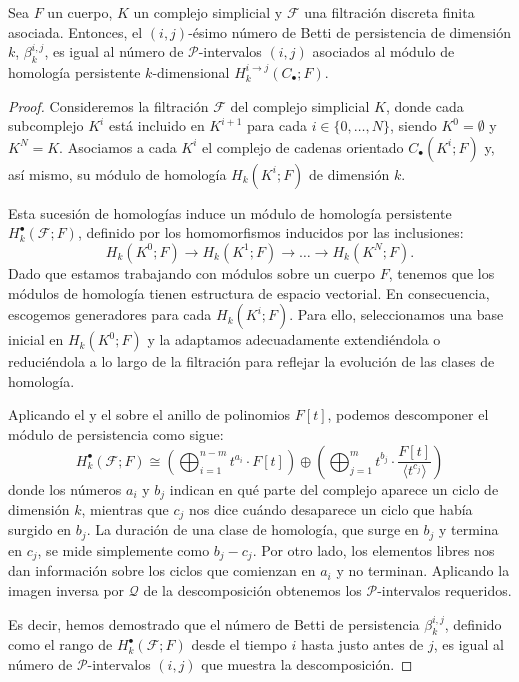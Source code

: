 \begin{corolario}
	Sea $F$ un cuerpo, $K$ un complejo simplicial y $\mathcal{F}$ una filtración discreta finita asociada. Entonces, el $(i,j)$-ésimo número de Betti de persistencia de dimensión $k$, \(\beta_k^{i,j}\), es igual al número de $\mathcal{P}$-intervalos $(i,j)$ asociados al módulo de homología persistente $k$-dimensional  \(H_k^{i \to j}(C_\bullet;F)\).
\end{corolario}
\begin{proof}
	Consideremos la filtración $\mathcal{F}$ del complejo simplicial $K$, donde cada subcomplejo $K^i$ está incluido en $K^{i+1}$ para cada $i \in \{0, \ldots, N\}$, siendo $K^0=\emptyset$ y $K^N = K$. Asociamos a cada $K^i$ el complejo de cadenas orientado $C_\bullet(K^i; F)$ y, así mismo, su módulo de homología $H_k(K^i; F)$ de dimensión $k$.
	
	Esta sucesión de homologías induce un módulo de homología persistente $H_k^\bullet(\mathcal{F}; F)$, definido por los homomorfismos inducidos por las inclusiones:
	\[
	H_k(K^0; F) \to H_k(K^1; F) \to \dots \to H_k(K^N; F).
	\]
	Dado que estamos trabajando con módulos sobre un cuerpo $F$, tenemos que los módulos de homología tienen estructura de espacio vectorial. En consecuencia, escogemos generadores para cada $H_k(K^i; F)$. Para ello, seleccionamos una base inicial en $H_k(K^0; F)$ y la adaptamos adecuadamente extendiéndola o reduciéndola a lo largo de la filtración para reflejar la evolución de las clases de homología.
	
	Aplicando el  y el  sobre el anillo de polinomios $F[t]$, podemos descomponer el módulo de persistencia como sigue:
	\[
	H_k^\bullet(\mathcal{F}; F) \cong \left( \bigoplus_{i=1}^{n-m} t^{a_i} \cdot F[t] \right) \oplus \left( \bigoplus_{j=1}^m t^{b_j} \cdot \frac{F[t]}{ \langle t^{c_j} \rangle} \right)
	\]
	donde los números \(a_i\) y \(b_j\) indican en qué parte del complejo aparece un ciclo de dimensión \(k\), mientras que \(c_j\) nos dice cuándo desaparece un ciclo que había surgido en \(b_j\). La duración de una clase de homología, que surge en \(b_j\) y termina en \(c_j\), se mide simplemente como \(b_j - c_j\). Por otro lado, los elementos libres nos dan información sobre los ciclos que comienzan en \(a_i\) y no terminan. Aplicando la imagen inversa por $\mathcal{Q}$ de la descomposición obtenemos los $\mathcal{P}$-intervalos requeridos.
	
	Es decir, hemos demostrado que el número de Betti de persistencia $\beta_k^{i,j}$, definido como el rango de $H_k^\bullet(\mathcal{F};F)$ desde el tiempo $i$ hasta justo antes de $j$, es igual al número de $\mathcal{P}$-intervalos $(i, j)$ que muestra la descomposición.
\end{proof}

